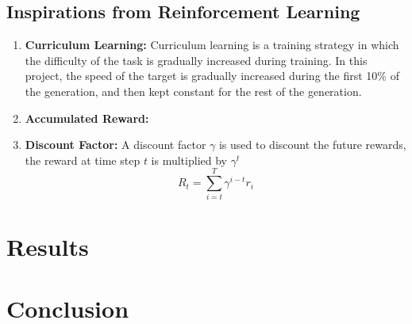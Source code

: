 \documentclass[sigconf]{acmart}
\begin{document}
\subsection{Inspirations from Reinforcement Learning}
\begin{enumerate}
  \item \textbf{Curriculum Learning:} Curriculum learning is a training strategy in which the difficulty of the task is gradually increased during training. In this project, the speed of the target is gradually increased during the first 10\% of the generation, and then kept constant for the rest of the generation.
  \item \textbf{Accumulated Reward:}
  \item \textbf{Discount Factor:} A discount factor $\gamma$ is used to discount the future rewards, the reward at time step $t$ is multiplied by $\gamma^t$
  \begin{equation}
    R_t = \sum_{i=t}^{T} \gamma^{i-t} r_i
    \label{eq:discount}
  \end{equation}
\end{enumerate}


\section{Results}

\section{Conclusion}



\end{document}
